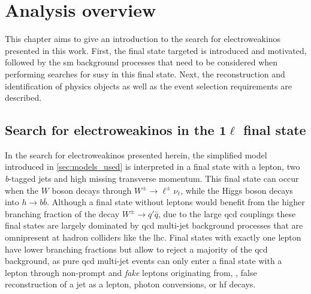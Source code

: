 
\chapter{Analysis overview}\label{ch:1lepton}

\ifpdf
    \graphicspath{{chapter-analysis/Figs/Raster/}{chapter-analysis/Figs/PDF/}{chapter-analysis/Figs/}}
\else
    \graphicspath{{chapter-analysis/Figs/Vector/}{chapter-analysis/Figs/}}
\fi


This chapter aims to give an introduction to the search for electroweakinos presented in this work. First, the final state targeted is introduced and motivated, followed by the \gls{sm} background processes that need to be considered when performing searches for \gls{susy} in this final state. Next, the reconstruction and identification of physics objects as well as the event selection requirements are described.

\section[Search for electroweakinos in the $1\ell$ final state]{Search for electroweakinos in the $\boldsymbol{1\ell}$ final state}

In the search for electroweakinos presented herein, the simplified model introduced in \cref{sec:models_used} is interpreted in a final state with a lepton, two \textit{b}-tagged jets and high missing transverse momentum.
This final state can occur when the $W$ boson decays through $W^\pm\rightarrow\ell^\pm\nu_\ell$, while the Higgs boson decays into $h\rightarrow b\bar{b}$.
Although a final state without leptons would benefit from the higher branching fraction of the decay $W^\pm\rightarrow q'\bar{q}$, due to the large \gls{qcd} couplings these final states are largely dominated by \gls{qcd} multi-jet background processes that are omnipresent at hadron colliders like the \gls{lhc}.
Final states with exactly one lepton have lower branching fractions but allow to reject a majority of the \gls{qcd} background, as pure \gls{qcd} multi-jet events can only enter a final state with a lepton through non-prompt and \textit{fake} leptons originating from, \eg, false reconstruction of a jet as a lepton, photon conversions, or \gls{hf} decays. 

